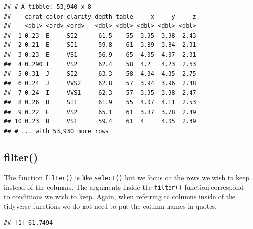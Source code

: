 \documentclass[
]{book}
\newenvironment{Shaded}{\begin{snugshade}}{\end{snugshade}}
\newcommand{\CommentTok}[1]{\textcolor[rgb]{0.56,0.35,0.01}{\textit{#1}}}
\newcommand{\KeywordTok}[1]{\textcolor[rgb]{0.13,0.29,0.53}{\textbf{#1}}}
\newcommand{\NormalTok}[1]{#1}
\newcommand{\OperatorTok}[1]{\textcolor[rgb]{0.81,0.36,0.00}{\textbf{#1}}}
\newcommand{\StringTok}[1]{\textcolor[rgb]{0.31,0.60,0.02}{#1}}
\begin{document}
\begin{verbatim}
## # A tibble: 53,940 x 8
##    carat color clarity depth table     x     y     z
##    <dbl> <ord> <ord>   <dbl> <dbl> <dbl> <dbl> <dbl>
##  1 0.23  E     SI2      61.5    55  3.95  3.98  2.43
##  2 0.21  E     SI1      59.8    61  3.89  3.84  2.31
##  3 0.23  E     VS1      56.9    65  4.05  4.07  2.31
##  4 0.290 I     VS2      62.4    58  4.2   4.23  2.63
##  5 0.31  J     SI2      63.3    58  4.34  4.35  2.75
##  6 0.24  J     VVS2     62.8    57  3.94  3.96  2.48
##  7 0.24  I     VVS1     62.3    57  3.95  3.98  2.47
##  8 0.26  H     SI1      61.9    55  4.07  4.11  2.53
##  9 0.22  E     VS2      65.1    61  3.87  3.78  2.49
## 10 0.23  H     VS1      59.4    61  4     4.05  2.39
## # ... with 53,930 more rows
\end{verbatim}

\hypertarget{filter}{%
\subsection{filter()}\label{filter}}

The function \texttt{filter()} is like \texttt{select()} but we focus on the rows we wish to keep instead of the columns. The arguments inside the \texttt{filter()} function correspond to conditions we wish to keep. Again, when referring to columns inside of the tidyverse functions we do not need to put the column names in quotes.

\begin{Shaded}
\end{Shaded}

\begin{verbatim}
## [1] 61.7494
\end{verbatim}

\begin{Shaded}
\end{Shaded}
\end{document}
